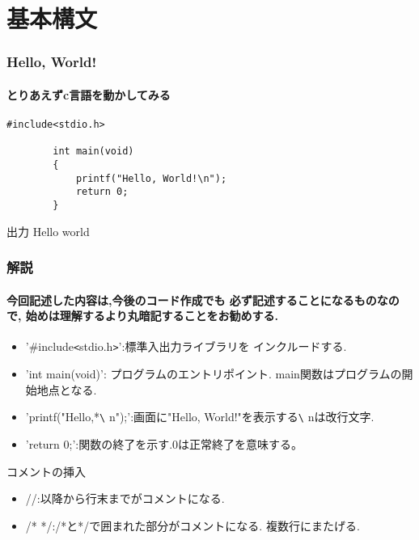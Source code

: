 \documentclass[dvipdfmx]{beamer}
\begin{document}
\section{基本構文}
\begin{frame}[c, fragile, label=10]
    \frametitle{Hello, World!}
    \framesubtitle{とりあえずc言語を動かしてみる}
    \begin{lstlisting}[gobble=8, caption=hello.c, label=hello]
        #include<stdio.h>

        int main(void)
        {
            printf("Hello, World!\n");
            return 0;
        }
    \end{lstlisting}
    \begin{block}{出力}
        Hello world
    \end{block}
    \vfill \hfill 
    \hyperlink{9}{}
    \space
    \hyperlink{11}{}
\end{frame}

\begin{frame}[t, fragile, label=11]
    \frametitle{解説}
    \framesubtitle{今回記述した内容は,今後のコード作成でも
        必ず記述することになるものなので,
        始めは理解するより丸暗記することをお勧めする.}
    \begin{itemize}
        \item '\#include\verb|<|stdio.h\verb|>|':標準入出力ライブラリを
                インクルードする.
        \item 'int main(void)': プログラムのエントリポイント.
                main関数はプログラムの開始地点となる.
        \item 'printf("Hello,*\verb|\| n");':画面に"Hello, 
                World!"を表示する\verb|\| nは改行文字.
        \item 'return 0;':関数の終了を示す.0は正常終了を意味する。
    \end{itemize}
    \begin{itembox}[l]{コメントの挿入}
        \begin{itemize}
            \item //:以降から行末までがコメントになる.
            \item /* */:/*と*/で囲まれた部分がコメントになる.
                    複数行にまたげる.
        \end{itemize}
    \end{itembox}
    \vfill \hfill 
    \hyperlink{10}{}
    \space
    \hyperlink{12}{}
\end{frame}
\end{document}
